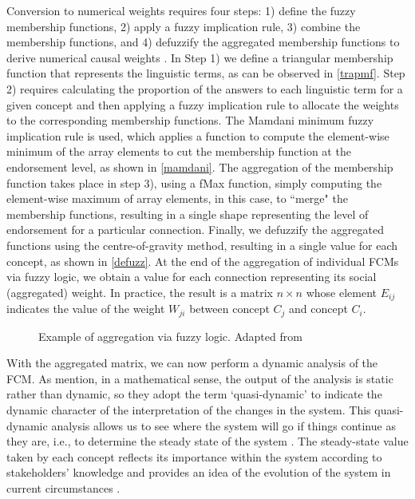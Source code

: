 \begin{appendices}
Conversion to numerical weights requires four steps: 1) define the fuzzy membership functions, 2) apply a fuzzy implication rule, 3) combine the membership functions, and 4) defuzzify the aggregated membership functions to derive numerical causal weights \citep{mkhitaryan2022fcmpy}. In Step 1) we define a triangular membership function that represents the linguistic terms, as can be observed in \cref{trapmf}. Step 2) requires calculating the proportion of the answers to each linguistic term for a given concept and then applying a fuzzy implication rule to allocate the weights to the corresponding membership functions. The Mamdani minimum fuzzy implication rule is used, which applies a function to compute the element-wise minimum of the array elements to cut the membership function at the endorsement level, as shown in \cref{mamdani}. The aggregation of the membership function takes place in step 3), using a fMax function, simply computing the element-wise maximum of array elements, in this case, to ``merge" the membership functions, resulting in a single shape representing the level of endorsement for a particular connection. Finally, we defuzzify the aggregated functions using the centre-of-gravity method, resulting in a single value for each concept, as shown in \cref{defuzz}. At the end of the aggregation of individual FCMs via fuzzy logic, we obtain a value for each connection representing its social (aggregated) weight. In practice, the result is a matrix $n \times n$ whose element $ E_{ij} $ indicates the value of the weight $ W_{ji} $ between concept $ C_{j} $ and concept $ C_{i} $. 



\begin{figure}\centering
{}\hfill
{}\par 
{}
\caption{Example of aggregation via fuzzy logic. Adapted from \cite{mkhitaryan2022fcmpy}}
\label{FCMpy}
\end{figure}


With the aggregated matrix, we can now perform a dynamic analysis of the FCM. As \cite{edwards2021building} mention, in a mathematical sense, the output of the analysis is static rather than dynamic, so they adopt the term ‘quasi-dynamic’ to indicate the dynamic character of the interpretation of the changes in the system. This quasi-dynamic analysis allows us to see where the system will go if things continue as they are, i.e., to determine the steady state of the system \citep{ozesmi2004ecological}. The steady-state value taken by each concept reflects its importance within the system according to stakeholders' knowledge and provides an idea of the evolution of the system in current circumstances \citep{lopolito2020combined}. 


\end{appendices}

